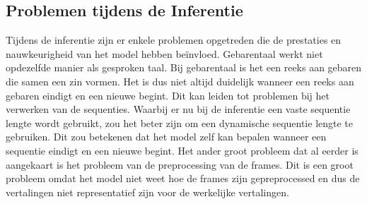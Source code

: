 \subsection{Problemen tijdens de Inferentie}
\label{sec:inferentie-problemen}
Tijdens de inferentie zijn er enkele problemen opgetreden die de prestaties en nauwkeurigheid van het model hebben beïnvloed.
Gebarentaal werkt niet opdezelfde manier als gesproken taal.
Bij gebarentaal is het een reeks aan gebaren die samen een zin vormen.
Het is dus niet altijd duidelijk wanneer een reeks aan gebaren eindigt en een nieuwe begint.
Dit kan leiden tot problemen bij het verwerken van de sequenties.
Waarbij er nu bij de inferentie een vaste sequentie lengte wordt gebruikt, zou het beter zijn om een dynamische sequentie lengte te gebruiken.
Dit zou betekenen dat het model zelf kan bepalen wanneer een sequentie eindigt en een nieuwe begint.
Het ander groot probleem dat al eerder is aangekaart is het probleem van de preprocessing van de frames.
Dit is een groot probleem omdat het model niet weet hoe de frames zijn gepreprocessed en dus de vertalingen niet representatief zijn voor de werkelijke vertalingen.